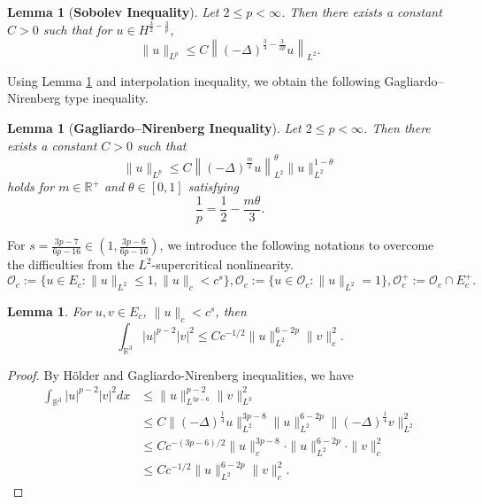 \documentclass{amsart}
\theoremstyle{plain}
\newtheorem{lemma}[theorem]{Lemma}
\theoremstyle{definition}
\theoremstyle{remark}
\numberwithin{equation}{section} \numberwithin{figure}{section}
\begin{document}
\begin{lemma}[\textbf{Sobolev Inequality}]\label{SB}
Let $2 \leq p < \infty$. Then there exists a constant $C > 0$ such that for
$u\in H^{\frac{3}{2}-\frac{3}{p}}$, 
\[
\|u\|_{L^p} \leq C \left\|(-\Delta)^{\frac{3}{4} - \frac{3}{2p}} u \right\|_{L^2}.
\]
\end{lemma}

Using Lemma \ref{SB} and interpolation inequality, we obtain the following Gagliardo--Nirenberg type inequality.

\begin{lemma}[\textbf{Gagliardo--Nirenberg Inequality}]\label{GN}
Let $2 \leq p < \infty$. Then there exists a constant $C > 0$ such that
\[
\|u\|_{L^p} \leq C \left\|(-\Delta)^{\frac{m}{2}} u \right\|_{L^2}^\theta \|u\|_{L^2}^{1-\theta}
\]
holds for $m \in \mathbb{R}^+$ and $\theta \in [0,1]$ satisfying
\[
\frac{1}{p} = \frac{1}{2} - \frac{m\theta}{3}.
\]
\end{lemma}

For $s= \frac{3p-7}{6p-16}\in \left(1,\frac{3p-6}{6p-16}\right)$, we introduce the following notations to overcome the difficulties from the $L^2$-supercritical nonlinearity.
$$\mathscr{O}_c := \{
u\in E_c: \|u\|_{L^2}\leq 1, \|u\|_c < c^s 
\}, 
\mathcal{O}_c := \{
u\in \mathscr{O}_c: \|u\|_{L^2}=1 
\}, 
\mathcal{O}_c^+:= \mathcal{O}_c \cap E_c^+.
$$


\begin{lemma}\label{loc_ineq}
    For $u, v\in E_c$, $ \|u\|_c < c^s$, then
    $$
    \int_{\mathbb{R}^3}|u|^{p-2}|v|^2\leq C c^{-{1}/{2}}\|u\|_{L^2}^{6-2p} \|v\|_c^2.
    $$
\end{lemma}
\begin{proof}
    By H\"older and Gagliardo-Nirenberg inequalities, we have
    \begin{equation*}
        \begin{split}
            \int_{\mathbb{R}^3}|u|^{p-2}|v|^2 dx
                  &\leq \|u\|_{L^{3p-6 }}^{p-2}\|v\|_{L^3}^2\\
                  &\leq C
                  \|(-\Delta)^{\frac14}u\|_{L^2}^{3p-8} \|u\|_{L^2}^{6-2p}    \|(-\Delta)^{\frac14}v\|_{L^2}^2\\
                  &\leq C c^{-(3p-6)/2}
                  \|u\|_c^{3p-8}\cdot  \|u\|_{L^2}^{6-2p}   \cdot \|v\|_c^2\\
                  & \leq C c^{-1/2}\|u\|_{L^2}^{6-2p} \|v\|_c^2.
        \end{split}
    \end{equation*}
\end{proof}
\end{document}
